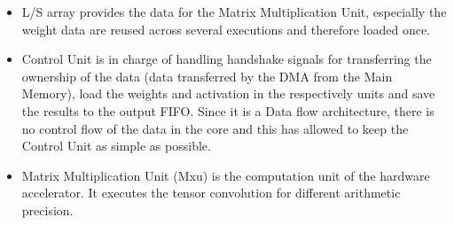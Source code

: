 \begin{itemize}
\item L/S array provides the data for the Matrix Multiplication Unit, especially the weight data are reused across several executions and therefore loaded once.
\item Control Unit is in charge of handling handshake signals for transferring the ownership of the data (data transferred by the DMA from the Main Memory), load the weights and activation in the respectively units and save the results to the output FIFO. Since it is a Data flow architecture, there is no control flow of the data in the core and this has allowed to keep the Control Unit as simple as possible.
\item Matrix Multiplication Unit (Mxu) is the computation unit of the hardware accelerator. It executes the tensor convolution for different arithmetic precision.
\end{itemize}
\newpage

